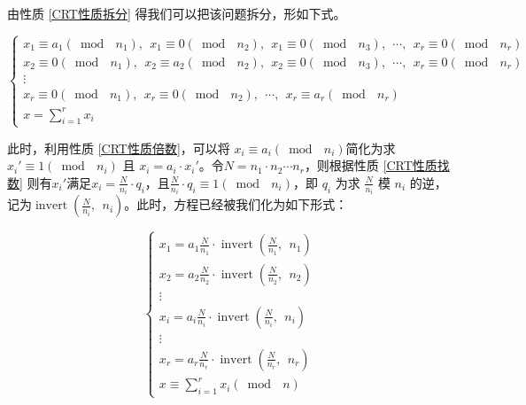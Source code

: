 \documentclass[a4paper]{article}         %
\newcommand{\upcite}[1]{\textsuperscript{\cite{#1}}} %
\begin{document}
由性质 \ref{CRT性质拆分} 得我们可以把该问题拆分，形如下式。

\[
	\begin{cases}
		x_1 \equiv a_1(\bmod \phantom{;} n_1), \phantom{;} x_1 \equiv 0 (\bmod \phantom{;} n_2), \phantom{;} x_1 \equiv 0 (\bmod \phantom{;} n_3), \phantom{;} \cdots, \phantom{;} x_r \equiv 0 (\bmod \phantom{;} n_r) \\
		x_2 \equiv 0(\bmod \phantom{;} n_1), \phantom{;} x_2 \equiv a_2 (\bmod \phantom{;} n_2), \phantom{;} x_2 \equiv 0 (\bmod \phantom{;} n_3), \phantom{;} \cdots, \phantom{;} x_r \equiv 0 (\bmod \phantom{;} n_r) \\
		\vdots                                                                                                                                                                                                          \\
		x_r \equiv 0(\bmod \phantom{;} n_1), \phantom{;} x_r \equiv 0 (\bmod \phantom{;} n_2), \phantom{;} \cdots, \phantom{;} x_r \equiv a_r (\bmod \phantom{;} n_r)                                                   \\
		x = \sum \limits_{i=1}^{r} x_i
	\end{cases}
\]

此时，利用性质 \ref{CRT性质倍数}，可以将 $x_i \equiv a_i(\bmod \phantom{;} n_i)$简化为求$x_i' \equiv 1 (\bmod \phantom{;} n_i)$ 且 $x_i = a_i \cdot x_i'$。令$N=n_1 \cdot n_2 \cdots n_r$，则根据性质 \ref{CRT性质找数} 则有$x_i'$满足$x_i = \frac{N}{n_i} \cdot q_i$，且$\frac{N}{n_i} \cdot q_i \equiv 1 (\bmod \phantom{;} n_i)$，即 $q_i$ 为求 $\frac{N}{n_i}$ 模 $n_i$ 的逆，记为$\operatorname{invert}(\frac{N}{n_i}, \phantom{;} n_i)$\upcite{中国剩余定理(CRT)}。此时，方程已经被我们化为如下形式：

\[
	\begin{cases}
		x_1 = a_1\frac{N}{n_1} \cdot \operatorname{invert}(\frac{N}{n_1}, \phantom{;} n_1) \\
		x_2 = a_2\frac{N}{n_2} \cdot \operatorname{invert}(\frac{N}{n_2}, \phantom{;} n_2) \\
		\vdots                                                                             \\
		x_i = a_i\frac{N}{n_i} \cdot \operatorname{invert}(\frac{N}{n_i}, \phantom{;} n_i) \\
		\vdots                                                                             \\
		x_r = a_r\frac{N}{n_r} \cdot \operatorname{invert}(\frac{N}{n_r}, \phantom{;} n_r) \\
		x \equiv \sum \limits_{i=1}^{r} x_i(\bmod \phantom{;} n)
	\end{cases}
\]
\end{document}
